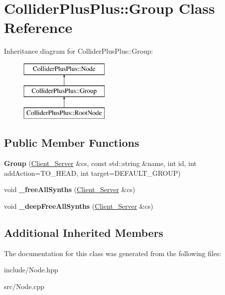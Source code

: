 \hypertarget{classColliderPlusPlus_1_1Group}{\section{Collider\-Plus\-Plus\-:\-:Group Class Reference}
\label{classColliderPlusPlus_1_1Group}
}
Inheritance diagram for Collider\-Plus\-Plus\-:\-:Group\-:\begin{figure}[H]
\begin{center}
\leavevmode
\includegraphics[height=3.000000cm]{classColliderPlusPlus_1_1Group}
\end{center}
\end{figure}
\subsection*{Public Member Functions}
\begin{DoxyCompactItemize}
\item 
\hypertarget{classColliderPlusPlus_1_1Group_ac33222e7c7705d374dba6e4d5b97acf5}{{\bfseries Group} (\hyperlink{classColliderPlusPlus_1_1Client__Server}{Client\-\_\-\-Server} \&cs, const std\-::string \&name, int id, int add\-Action=T\-O\-\_\-\-H\-E\-A\-D, int target=D\-E\-F\-A\-U\-L\-T\-\_\-\-G\-R\-O\-U\-P)}\label{classColliderPlusPlus_1_1Group_ac33222e7c7705d374dba6e4d5b97acf5}

\item 
\hypertarget{classColliderPlusPlus_1_1Group_a343180ba103935aa4f88d1671764bf97}{void {\bfseries \-\_\-free\-All\-Synths} (\hyperlink{classColliderPlusPlus_1_1Client__Server}{Client\-\_\-\-Server} \&cs)}\label{classColliderPlusPlus_1_1Group_a343180ba103935aa4f88d1671764bf97}

\item 
\hypertarget{classColliderPlusPlus_1_1Group_a3ed1ee8595e234c4417225d271ecab42}{void {\bfseries \-\_\-deep\-Free\-All\-Synths} (\hyperlink{classColliderPlusPlus_1_1Client__Server}{Client\-\_\-\-Server} \&cs)}\label{classColliderPlusPlus_1_1Group_a3ed1ee8595e234c4417225d271ecab42}

\end{DoxyCompactItemize}
\subsection*{Additional Inherited Members}


The documentation for this class was generated from the following files\-:\begin{DoxyCompactItemize}
\item 
include/Node.\-hpp\item 
src/Node.\-cpp\end{DoxyCompactItemize}
